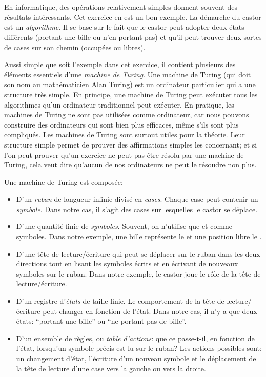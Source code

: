 {{%
\section*{\BrochureItsInformatics}
En informatique, des opérations relativement simples donnent souvent des résultats intéressants. Cet exercice en est un bon exemple. La démarche du castor est un \emph{algorithme}. Il se base sur le fait que le castor peut adopter deux états différents (portant une bille ou n’en portant pas) et qu’il peut trouver deux sortes de cases sur son chemin (occupées ou libres).

Aussi simple que soit l’exemple dans cet exercice, il contient plusieurs des éléments essentiels d’une \emph{machine de Turing}.
Une machine de Turing (qui doit son nom au mathématicien Alan Turing) est un ordinateur particulier qui a une structure très simple. En principe, une machine de Turing peut exécuter tous les algorithmes qu’un ordinateur traditionnel peut exécuter. En pratique, les machines de Turing ne sont pas utilisées comme ordinateur, car nous pouvons construire des ordinateurs qui sont bien plus efficaces, même s’ils sont plus compliqués. Les machines de Turing sont surtout utiles pour la théorie. Leur structure simple permet de prouver des affirmations simples les concernant; et si l’on peut prouver qu’un exercice ne peut pas être résolu par une machine de Turing, cela veut dire qu’aucun de nos ordinateurs ne peut le résoudre non plus.

Une machine de Turing est composée:

\begin{itemize}
  \item D’un \emph{ruban} de longueur infinie divisé en \emph{cases}. Chaque case peut contenir un \emph{symbole}. Dans notre cas, il s’agit des cases sur lesquelles le castor se déplace.
  \item D’une quantité finie de \emph{symboles}. Souvent, on n’utilise que  et  comme symboles. Dans notre exemple, une bille représente le  et une position libre le .
  \item D’une tête de lecture/écriture qui peut se déplacer sur le ruban dans les deux directions tout en lisant les symboles écrits et en écrivant de nouveaux symboles sur le ruban. Dans notre exemple, le castor joue le rôle de la tête de lecture/écriture.
  \item D’un registre d’\emph{états} de taille finie. Le comportement de la tête de lecture/écriture peut changer en fonction de l’état. Dans notre cas, il n’y a que deux états: “portant une bille” ou “ne portant pas de bille”.
  \item D’un ensemble de règles, ou \emph{table d’actions}: que ce passe-t-il, en fonction de l’état, lorsqu’un symbole précis est lu sur le ruban? Les actions possibles sont: un changement d’état, l’écriture d’un nouveau symbole et le déplacement de la tête de lecture d’une case vers la gauche ou vers la droite.
\end{itemize}



}}
